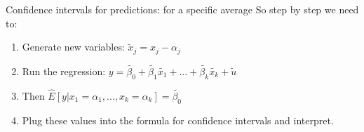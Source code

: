 \documentclass[
  ignorenonframetext,
]{beamer}
\begin{document}
\begin{frame}{Confidence intervals for predictions: for a specific
average}
\protect\hypertarget{confidence-intervals-for-predictions-for-a-specific-average-5}{}
So step by step we need to:

\begin{enumerate}
[1)]
\item
  Generate new variables: \(\tilde{x}_j=x_j-\alpha_j\)
\item
  Run the regression:
  \(y=\tilde{\beta_0}+\tilde{\beta_1}\tilde{x_1}+...+\tilde{\beta_k}\tilde{x_k}+\tilde{u}\)
\item
  Then \(\hat{E}[y|x_1=\alpha_1,...,x_k=\alpha_k]=\tilde{\beta_0}\)
\item
  Plug these values into the formula for confidence intervals and
  interpret.
\end{enumerate}
\end{frame}
\end{document}
